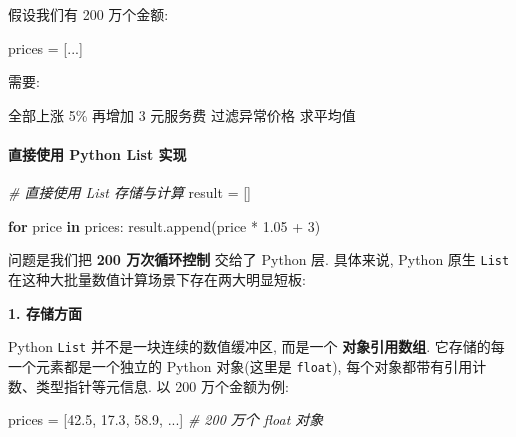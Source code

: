 \documentclass[11pt]{article}
\newenvironment{Shaded}{}{}
\newcommand{\KeywordTok}[1]{\textcolor[rgb]{0.00,0.44,0.13}{\textbf{{#1}}}}
\newcommand{\DecValTok}[1]{\textcolor[rgb]{0.25,0.63,0.44}{{#1}}}
\newcommand{\FloatTok}[1]{\textcolor[rgb]{0.25,0.63,0.44}{{#1}}}
\newcommand{\CommentTok}[1]{\textcolor[rgb]{0.38,0.63,0.69}{\textit{{#1}}}}
\newcommand{\NormalTok}[1]{{#1}}
\newcommand{\ControlFlowTok}[1]{\textcolor[rgb]{0.00,0.44,0.13}{\textbf{{#1}}}}
\newcommand{\OperatorTok}[1]{\textcolor[rgb]{0.40,0.40,0.40}{{#1}}}
\begin{document}
假设我们有 200 万个金额:

\begin{Shaded}
\begin{Highlighting}[]
\NormalTok{prices }\OperatorTok{=}\NormalTok{ [...]}
\end{Highlighting}
\end{Shaded}

需要:

\begin{Shaded}
\begin{Highlighting}[]
\NormalTok{全部上涨 5\%}
\NormalTok{再增加 3 元服务费}
\NormalTok{过滤异常价格}
\NormalTok{求平均值}
\end{Highlighting}
\end{Shaded}

\paragraph{直接使用 Python List
实现}\label{ux76f4ux63a5ux4f7fux7528-python-list-ux5b9eux73b0}

\begin{Shaded}
\begin{Highlighting}[]
\CommentTok{\# 直接使用 List 存储与计算}
\NormalTok{result }\OperatorTok{=}\NormalTok{ []}

\ControlFlowTok{for}\NormalTok{ price }\KeywordTok{in}\NormalTok{ prices:}
\NormalTok{    result.append(price }\OperatorTok{*} \FloatTok{1.05} \OperatorTok{+} \DecValTok{3}\NormalTok{)}
\end{Highlighting}
\end{Shaded}

问题是我们把 \textbf{200 万次循环控制} 交给了 Python 层. 具体来说,
Python 原生 \texttt{List} 在这种大批量数值计算场景下存在两大明显短板:

\textbf{1. 存储方面}

Python \texttt{List} 并不是一块连续的数值缓冲区, 而是一个
\textbf{对象引用数组}. 它存储的每一个元素都是一个独立的 Python
对象(这里是 \texttt{float}), 每个对象都带有引用计数、类型指针等元信息.
以 200 万个金额为例:

\begin{Shaded}
\begin{Highlighting}[]
\NormalTok{prices }\OperatorTok{=}\NormalTok{ [}\FloatTok{42.5}\NormalTok{, }\FloatTok{17.3}\NormalTok{, }\FloatTok{58.9}\NormalTok{, ...]   }\CommentTok{\# 200 万个 float 对象}
\end{Highlighting}
\end{Shaded}
\end{document}
